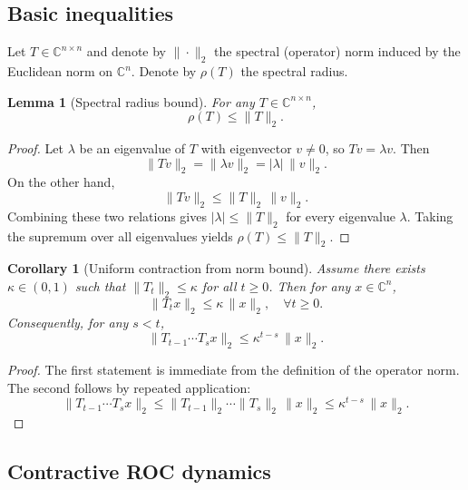 \documentclass[11pt]{article}
\theoremstyle{plain}
\newtheorem{lemma}[theorem]{Lemma}
\newtheorem{corollary}[theorem]{Corollary}
\theoremstyle{definition}
\numberwithin{equation}{section}
\begin{document}
\subsection{Basic inequalities}

Let $T \in \mathbb{C}^{n\times n}$ and denote by
$\|\cdot\|_2$ the spectral (operator) norm induced by the Euclidean
norm on $\mathbb{C}^n$. Denote by $\rho(T)$ the spectral radius.

\begin{lemma}[Spectral radius bound]
\label{lem:spectral-radius-bound}
For any $T \in \mathbb{C}^{n\times n}$,
\begin{equation}
  \rho(T) \le \|T\|_2.
\end{equation}
\end{lemma}

\begin{proof}
Let $\lambda$ be an eigenvalue of $T$ with eigenvector $v \ne 0$,
so $T v = \lambda v$. Then
\[
\|T v\|_2 = \|\lambda v\|_2 = |\lambda| \,\|v\|_2.
\]
On the other hand,
\[
\|T v\|_2 \le \|T\|_2 \,\|v\|_2.
\]
Combining these two relations gives $|\lambda| \le \|T\|_2$ for every
eigenvalue $\lambda$. Taking the supremum over all eigenvalues yields
$\rho(T) \le \|T\|_2$.
\end{proof}

\begin{corollary}[Uniform contraction from norm bound]
\label{cor:uniform-contraction}
Assume there exists $\kappa \in (0,1)$ such that
$\|T_t\|_2 \le \kappa$ for all $t \ge 0$. Then for any $x \in \mathbb{C}^n$,
\begin{equation}
  \|T_t x\|_2 \le \kappa \,\|x\|_2,
  \quad \forall t \ge 0.
\end{equation}
Consequently, for any $s < t$,
\begin{equation}
  \|T_{t-1} \cdots T_s x\|_2 \le \kappa^{t-s}\,\|x\|_2.
\end{equation}
\end{corollary}

\begin{proof}
The first statement is immediate from the definition of the operator
norm. The second follows by repeated application:
\[
\|T_{t-1}\cdots T_s x\|_2
  \le \|T_{t-1}\|_2 \cdots \|T_s\|_2 \,\|x\|_2
  \le \kappa^{t-s}\,\|x\|_2.
\]
\end{proof}

\subsection{Contractive ROC dynamics}
\end{document}
